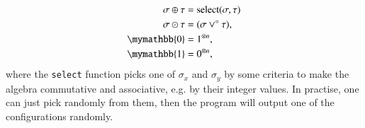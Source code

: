 \documentclass[review,onefignum,onetabnum]{siamart190516}
\newcommand{\<}{\langle}
\renewcommand{\>}{\rangle}
\begin{document}

\begin{align}
\begin{split}
    \sigma \oplus \tau &= {\rm select}(\sigma, \tau)\\
    \sigma \odot \tau &= (\sigma\lor^\circ \tau),\\
    \mymathbb{0} &= 1^{\otimes n},\\
    \mymathbb{1} &= 0^{\otimes n},
\end{split}\label{eq:singleconfig}
\end{align}
where the \texttt{select} function picks one of $\sigma_x$ and $\sigma_y$ by some criteria to make the algebra commutative and associative, e.g. by their integer values.
In practise, one can just pick randomly from them, then the program will output one of the configurations randomly.
\end{document}

